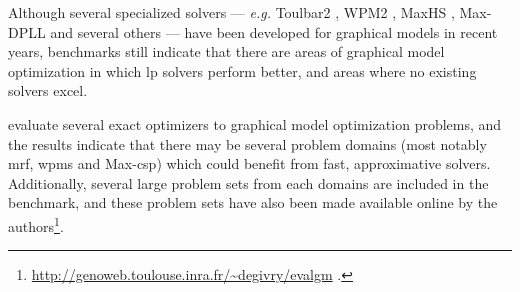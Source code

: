Although several specialized solvers --- \emph{e.g.} Toulbar2 \parencite{Allouche10}, WPM2 \parencite{Ansotegui13b}, MaxHS \parencite{Davies13}, Max-DPLL \parencite{Larrosa08} and several others --- have been developed for graphical models in recent years, benchmarks still indicate that there are areas of graphical model optimization in which \gls{lp} solvers perform better, and areas where no existing solvers excel.

\Textcites{Allouche14b}{deGivry14} evaluate several exact optimizers to graphical model optimization problems, and the results indicate that there may be several problem domains (most notably \acrshort{mrf}, \acrshort{wpms} and Max-\acrshort{csp}) which could benefit from fast, approximative solvers.
Additionally, several large problem sets from each domains are included in the benchmark, and these problem sets have also been made available online by the authors\footnote{\url{http://genoweb.toulouse.inra.fr/~degivry/evalgm} \parencite[\pno~7]{Allouche14b}.}.
